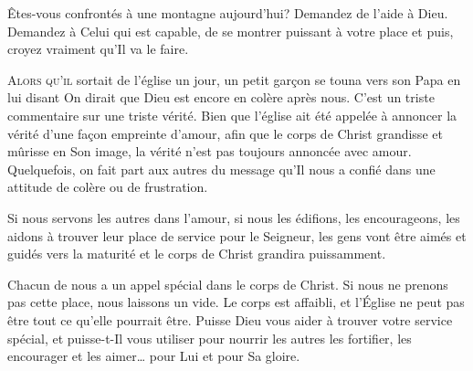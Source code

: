 Êtes-vous confrontés à une montagne aujourd'hui? Demandez de l'aide à Dieu.
 Demandez à Celui qui est capable, de se montrer puissant à votre place
 \ocadr et puis, croyez vraiment qu'Il va le faire.

\dvrule







\lettrine{A}{lors qu'il} sortait de l'église un jour,
 un petit gar\c{c}on se touna vers son Papa  en lui disant\frcolon{} 
 \Og On dirait que Dieu est encore en colère après nous. \Fg{}
 C'est un triste commentaire sur une triste vérité.
 Bien que l'église ait été appelée à annoncer la vérité
 d'une fa\c{c}on empreinte d'amour, afin que le corps de Christ grandisse
 et mûrisse en Son image, la vérité n'est pas toujours annoncée avec amour.
 Quelquefois, on fait part aux autres du message
 qu'Il nous a confié dans une attitude de colère ou de frustration. 


Si nous servons les autres dans l'amour, si nous les édifions,
 les encourageons, les aidons à trouver leur place de service
 pour le Seigneur, les gens vont être aimés et guidés
 vers la maturité
 \ocadr et le corps de Christ grandira puissamment.

Chacun de nous a un appel spécial dans le corps de Christ.
 Si nous ne prenons pas cette place, nous laissons un vide.
 Le corps est affaibli, et l'Église 
 ne peut pas être tout ce qu'elle pourrait être.
 Puisse Dieu vous aider à trouver votre service spécial,
 et puisse-t-Il vous utiliser pour nourrir les autres
 \ocadr les fortifier, les encourager et les aimer\dots{}
 pour Lui et pour Sa gloire.

